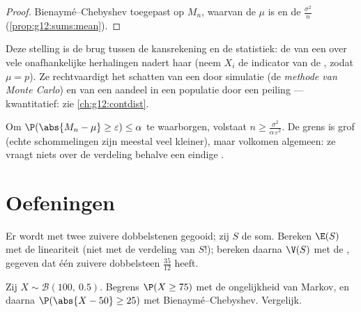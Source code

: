 \begin{proof}
Bienaymé--Chebyshev toegepast op $M_n$, waarvan de  $\mu$ is
en de  $\frac{\sigma^2}{n}$ (\cref{prop:g12:sums:mean}).
\end{proof}

\begin{remark}
Deze stelling is de brug tussen de kansrekening en de statistiek: de
\emph{} van een  over vele onafhankelijke herhalingen
nadert haar \emph{} (neem $X_i$ de indicator van de , zodat
$\mu = p$). Ze rechtvaardigt het schatten van een  door simulatie (de
\emph{methode van Monte Carlo}) en van een aandeel in een populatie door een
peiling --- kwantitatief: zie \cref{ch:g12:contdist}.
\end{remark}

\begin{method}\label{met:g12:sums:chebyshev}
Om $\P(\abs{M_n - \mu} \geq \varepsilon) \leq \alpha$ te waarborgen, volstaat
$n \geq \frac{\sigma^2}{\alpha\,\varepsilon^2}$. De grens is grof (echte
schommelingen zijn meestal veel kleiner), maar volkomen algemeen: ze vraagt
niets over de verdeling behalve een eindige .
\end{method}

\section{Oefeningen}

\begin{exercise}[$\star$]\label{exo:g12:sums:1}
Er wordt met twee zuivere dobbelstenen gegooid; zij $S$ de som. Bereken
$\E(S)$ met de lineariteit (niet met de verdeling van $S$!); bereken daarna
$\V(S)$ met de , gegeven dat één zuivere dobbelsteen
 $\frac{35}{12}$ heeft.
\end{exercise}

\begin{exercise}[$\star$]\label{exo:g12:sums:2}
Zij $X \sim \mathcal B(100,\ 0.5)$. Begrens $\P(X \geq 75)$ met de
ongelijkheid van Markov, en daarna $\P(\abs{X - 50} \geq 25)$ met
Bienaymé--Chebyshev. Vergelijk.
\end{exercise}

